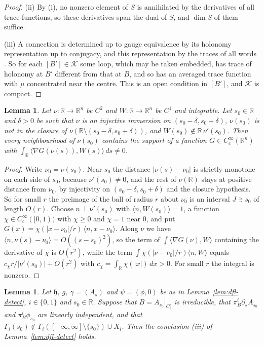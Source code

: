 \documentclass[11pt]{amsart}
\newtheorem{lemma}[theorem]{Lemma}
\theoremstyle{definition}
\theoremstyle{remark}
\theoremstyle{plain}
\numberwithin{equation}{section}
\newcommand{\RR}{\mathbb{R}}
\begin{document}
\begin{proof}
(ii) By (i), no nonzero element of $S$ is annihilated by the derivatives of all trace functions,
so these derivatives span the dual of $S$, and $\dim S$ of them suffice.

(iii) A connection is determined up to gauge equivalence by its holonomy representation up to
conjugacy, and this representation by the traces of all words \cite[Lemma~5.13 and
p.~141]{Donaldson-book}. So for each $[B']\in\mathcal K$ some loop, which may be taken embedded,
has trace of holonomy at $B'$ different from that at $B$, and so has an averaged trace function
with $\mu$ concentrated near the centre. This is an open condition in $[B']$, and $\mathcal K$ is
compact.
\end{proof}

\begin{lemma}\label{lem:app-localize}
Let $\nu\colon\RR\to\RR^n$ be $C^2$ and $W\colon\RR\to\RR^n$ be $C^1$ and integrable. Let
$s_0\in\RR$ and $\delta>0$ be such that $\nu$ is an injective immersion on $(s_0-\delta,s_0+\delta)$,
$\nu(s_0)$ is not in the closure of $\nu(\RR\setminus(s_0-\delta,s_0+\delta))$, and
$W(s_0)\notin\RR\,\nu'(s_0)$. Then every neighbourhood of $\nu(s_0)$ contains the support of a
function $G\in C^\infty_c(\RR^n)$ with $\int_\RR\langle\nabla G(\nu(s)),W(s)\rangle\,ds\ne0$.
\end{lemma}

\begin{proof}
Write $\nu_0=\nu(s_0)$. Near $s_0$ the distance $|\nu(s)-\nu_0|$ is strictly monotone on each
side of $s_0$, because $\nu'(s_0)\ne0$, and the rest of $\nu(\RR)$ stays at positive distance
from $\nu_0$, by injectivity on $(s_0-\delta,s_0+\delta)$ and the closure hypothesis. So for small
$r$ the preimage of the ball of radius $r$ about $\nu_0$ is an interval $J\ni s_0$ of length
$O(r)$. Choose $n\perp\nu'(s_0)$ with $\langle n,W(s_0)\rangle=1$, a function
$\chi\in C^\infty_c([0,1))$ with $\chi\ge0$ and $\chi=1$ near $0$, and put
$G(x)=\chi(|x-\nu_0|/r)\,\langle n,x-\nu_0\rangle$. Along $\nu$ we have
$\langle n,\nu(s)-\nu_0\rangle=O((s-s_0)^2)$, so the term of
$\int\langle\nabla G(\nu),W\rangle$ containing the derivative of $\chi$ is $O(r^2)$, while the
term $\int\chi(|\nu-\nu_0|/r)\langle n,W\rangle$ equals $c_\chi r/|\nu'(s_0)|+O(r^2)$ with
$c_\chi=\int_\RR\chi(|x|)\,dx>0$. For small $r$ the integral is nonzero.
\end{proof}

\begin{lemma}\label{lem:app-reduction}
Let $\mathfrak h$, $g$, $\gamma=(A_s)$ and $\psi=(\phi,0)$ be as in Lemma~\ref{lem:dfl-detect},
$i\in\{0,1\}$ and $s_0\in\RR$. Suppose that $B=A_{s_0}|_{C_i^\circ}$ is irreducible, that
$\pi^i_B\partial_sA_{s_0}$ and $\pi^i_B\phi_{s_0}$ are linearly independent, and that
$\Gamma_i(s_0)\notin\Gamma_i([-\infty,\infty]\setminus\{s_0\})\cup X_i$. Then the conclusion (iii)
of Lemma~\ref{lem:dfl-detect} holds.
\end{lemma}
\end{document}
